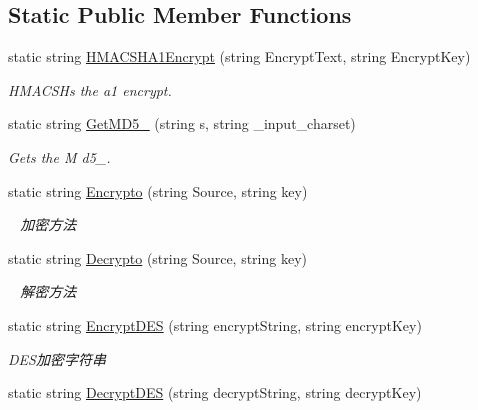 \subsection*{Static Public Member Functions}
\begin{DoxyCompactItemize}
\item 
static string \mbox{\hyperlink{class_t_net_1_1_context_1_1_encryption_manager_a08c2a9203e621642c3c80e314c56dae9}{H\+M\+A\+C\+S\+H\+A1\+Encrypt}} (string Encrypt\+Text, string Encrypt\+Key)
\begin{DoxyCompactList}\small\item\em H\+M\+A\+C\+S\+Hs the a1 encrypt. \end{DoxyCompactList}\item 
static string \mbox{\hyperlink{class_t_net_1_1_context_1_1_encryption_manager_af6848d5d29616051d6c2004e270e394b}{Get\+M\+D5\+\_}} (string s, string \+\_\+input\+\_\+charset)
\begin{DoxyCompactList}\small\item\em Gets the M d5\+\_. \end{DoxyCompactList}\item 
static string \mbox{\hyperlink{class_t_net_1_1_context_1_1_encryption_manager_a1c63d1313fc8e82154cdd1892e9731d2}{Encrypto}} (string Source, string key)
\begin{DoxyCompactList}\small\item\em ~\newline
加密方法 ~\newline
\end{DoxyCompactList}\item 
static string \mbox{\hyperlink{class_t_net_1_1_context_1_1_encryption_manager_ae05516dae4bcbedf23f430ffaa53d9f7}{Decrypto}} (string Source, string key)
\begin{DoxyCompactList}\small\item\em ~\newline
解密方法 ~\newline
\end{DoxyCompactList}\item 
static string \mbox{\hyperlink{class_t_net_1_1_context_1_1_encryption_manager_a1096ce8381701c52a24785a9c6adee4c}{Encrypt\+D\+ES}} (string encrypt\+String, string encrypt\+Key)
\begin{DoxyCompactList}\small\item\em D\+E\+S加密字符串 \end{DoxyCompactList}\item 
static string \mbox{\hyperlink{class_t_net_1_1_context_1_1_encryption_manager_a8f1224c4da5aca9cf7a84d7aaca378a1}{Decrypt\+D\+ES}} (string decrypt\+String, string decrypt\+Key)

\end{DoxyCompactItemize}
